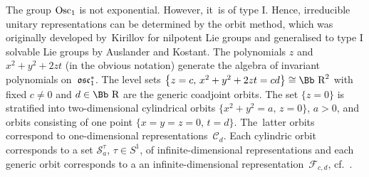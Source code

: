 \documentclass[pdftex]{sigma}
\newcommand\RR{{\mbox{\Bb R}}}
\newcommand\cC{{\mathcal C}}
\newcommand\cF{{\mathcal F}}
\newcommand\osc{\frak o \frak s \frak c}
\newcommand{\Osc}{{\rm Osc}}
\numberwithin{equation}{section}
\begin{document}
The group $\Osc_1$ is not exponential. However, it~is of type I. Hence, irreducible unitary representations can be determined by the orbit method, which was originally developed by~Kirillov for nilpotent Lie groups and generalised to type I solvable Lie groups by Auslander and Kostant. The polynomials $z$ and $x^2+y^2+2zt$ (in the obvious notation) generate the algebra of invariant polynomials on~$\osc_1^*$. The level sets $\big\{z=c,\, x^2+y^2+2zt=cd\big\}\cong\RR^2$ with fixed $c\not=0$ and $d\in\RR$ are the generic coadjoint orbits. The set $\{ z=0\}$ is stratified into two-dimensional cylindrical orbits $\big\{x^2+y^2=a,\, z=0\big\}$, $a>0$, and orbits consisting of one point $\{x=y=z=0,\, t=d\}$. The~latter orbits correspond to one-dimensional representations~$\cC_d$. Each cylindric \mbox{orbit} corresponds to a set ${\mathcal S}_a^\tau$, $\tau\in S^1$, of infinite-dimensional representations and each generic orbit corresponds to a an infinite-dimensional representation~$\cF_{c,d}$, cf.~\cite{Ki04}.
\end{document}
